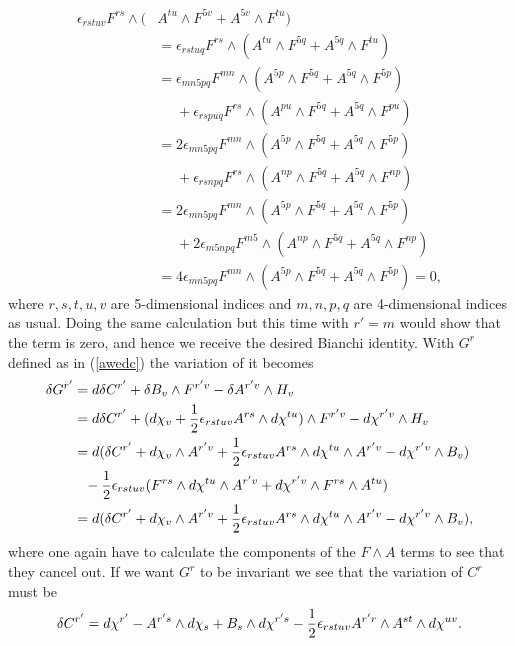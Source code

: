 \begin{align}
\epsilon_{rstuv}F^{rs} \wedge (&A^{tu} \wedge F^{5v} + A^{5v} \wedge F^{tu}) \nonumber \\
&=\epsilon_{rstuq}F^{rs} \wedge (A^{tu} \wedge F^{5q} + A^{5q} \wedge F^{tu}) \nonumber \\
&=\epsilon_{mn5pq}F^{mn} \wedge (A^{5p} \wedge F^{5q} + A^{5q} \wedge F^{5p}) \nonumber \\
&\phantom{=}+\epsilon_{rspuq}F^{rs} \wedge (A^{pu} \wedge F^{5q} + A^{5q} \wedge F^{pu}) \nonumber \\
&=2\epsilon_{mn5pq}F^{mn} \wedge (A^{5p} \wedge F^{5q} + A^{5q} \wedge F^{5p}) \nonumber \\
&\phantom{=}+\epsilon_{rsnpq}F^{rs} \wedge (A^{np} \wedge F^{5q} + A^{5q} \wedge F^{np}) \nonumber \\
&=2\epsilon_{mn5pq}F^{mn} \wedge (A^{5p} \wedge F^{5q} + A^{5q} \wedge F^{5p}) \nonumber \\
&\phantom{=}+2\epsilon_{m5npq}F^{m5} \wedge (A^{np} \wedge F^{5q} + A^{5q} \wedge F^{np}) \nonumber \\
&=4\epsilon_{mn5pq}F^{mn} \wedge (A^{5p} \wedge F^{5q} + A^{5q} \wedge F^{5p})=0,
\end{align}
where $r,s,t,u,v$ are 5-dimensional indices and $m,n,p,q$ are 4-dimensional indices as usual.
Doing the same calculation but this time with $r'=m$ would show that the term is zero, and hence we receive the desired Bianchi identity. With $G^r$ 
defined as in (\ref{awedc}) the variation of it becomes
\begin{align}
\delta G^{r'} &= d \delta C^{r'} + \delta B_v \wedge F^{r'v} - \delta A^{r'v} \wedge H_v \nonumber \\
&=d\delta C^{r'} + (d\chi_v + {1 \over 2}\epsilon_{rstuv}A^{rs} \wedge d\chi^{tu}) \wedge F^{r'v} - d\chi^{r'v} \wedge H_v \nonumber \\
&=d(\delta C^{r'} + d\chi_v \wedge A^{r'v} + {1 \over 2}\epsilon_{rstuv}A^{rs} \wedge d\chi^{tu} \wedge A^{r'v} - d\chi^{r'v} \wedge B_v) \nonumber \\
&\phantom{=}-{1 \over 2}\epsilon_{rstuv}(F^{rs} \wedge d\chi^{tu} \wedge A^{r'v} + d\chi^{r'v} \wedge F^{rs} \wedge A^{tu}) \nonumber \\
&=d(\delta C^{r'} + d\chi_v \wedge A^{r'v} + {1 \over 2}\epsilon_{rstuv}A^{rs} \wedge d\chi^{tu} \wedge A^{r'v} - d\chi^{r'v} \wedge B_v),
\end{align}
where one again have to calculate the components of the $F \wedge A$ terms to see that they cancel out.
If we want $G^r$ to be invariant we see that the variation of $C^r$ must be
\begin{equation}
\delta C^{r'}=d\chi^{r'} - A^{r's} \wedge d\chi_s + B_s \wedge d\chi^{r's} - {1 \over 2}\epsilon_{rstuv}A^{r'r} \wedge A^{st} \wedge d\chi^{uv}.
\end{equation}

